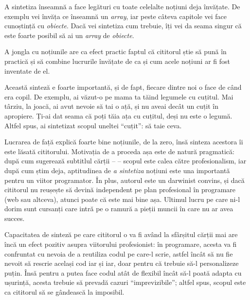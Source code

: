 

A sintetiza înseamnă a face legături cu toate celelalte noțiuni deja învățate.
De exemplu vei învăța ce înseamnă un \textit{array}, iar peste câteva capitole
vei face cunoștință cu \textit{obiecte}. Dacă vei sintetiza cum trebuie, îți vei
da seama singur că este foarte posibil să ai un \textit{array} de
\textit{obiecte}.

A jongla cu noțiunile are ca efect practic faptul că cititorul știe să pună în
practică și să combine lucrurile învățate de ca și cum acele noțiuni ar fi fost
inventate de el.


Această sinteză e foarte importantă, și de fapt, fiecare dintre noi o face de
când era copil. De exemplu, ai văzut-o pe mama ta tăind legumele cu cuțitul.
Mai târziu, la joacă, ai avut nevoie să tai o ață, și nu aveai decât un cuțit
în apropiere. Ți-ai dat seama că poți tăia ața cu cuțitul, deși nu este
o legumă. Altfel spus, ai sintetizat scopul uneltei ``cuțit'': să taie ceva.

Lucrarea de față explică foarte bine noțiunile, de la zero, însă sinteza
acestora îi este lăsată cititorului. Motivația de a proceda așa este de natură
pragmatică: după cum sugerează subtitlul cărții -- \textit{\thesubtitle} --
scopul este calea către profesionalism, iar după cum știm deja, aptitudinea de
\textit{a sintetiza} noțiuni este una importantă pentru un viitor programator.
În plus, autorul este un darwinist convins, și dacă cititorul nu reușește să
devină independent pe plan profesional în programare (web sau altceva), atunci
poate că este mai bine așa. Ultimul lucru pe care ni-l dorim sunt cursanți care
intră pe o ramură a pieții muncii în care nu ar avea succes.

Capacitatea de sinteză pe care cititorul o va fi având la sfârșitul cărții mai
are încă un efect pozitiv asupra viitorului profesionist: în programare, acesta
va fi confruntat cu nevoia de a reutiliza codul pe care-l scrie, astfel încât
să nu fie nevoit să rescrie același cod iar și iar, doar pentru că trebuie să-l
personalizeze puțin. Însă pentru a putea face codul atât de flexibil încât să-l
poată adapta cu ușurință, acesta trebuie să prevadă cazuri ``imprevizibile'';
altfel spus, scopul este ca cititorul să se gândească la imposibil.

